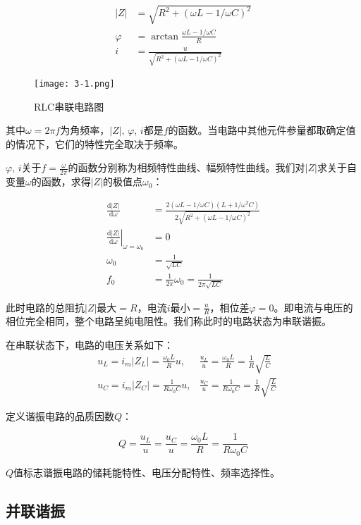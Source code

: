 \documentclass[12pt]{article}
\begin{document}
\[
    \begin{aligned}
        |Z|&=\sqrt{R^2+(\omega L-1/\omega C)^2} \\
        \varphi&=\arctan\frac{\omega L-1/\omega C}{R} \\
        i&=\frac{u}{\sqrt{R^2+(\omega L-1/\omega C)^2}}
    \end{aligned}
\]

\begin{figure}[htbp]\label{fig:1}
    \centering
    \texttt{[image: 3-1.png]}
    \caption{RLC串联电路图}
\end{figure}

其中$\omega=2\pi f$为角频率，$|Z|,\,\varphi,\,i$都是$f$的函数。当电路中其他元件参量都取确定值的情况下，它们的特性完全取决于频率。

$\varphi,\,i$关于$f=\frac{\omega}{2\pi}$的函数分别称为相频特性曲线、幅频特性曲线。我们对$|Z|$求关于自变量$\omega$的函数，求得$|Z|$的极值点$\omega_0$：

\[
    \begin{aligned}
        \frac{\mathrm{d}|Z|}{\mathrm{d}\omega}&=\frac{2(\omega L-1/\omega C)(L+1/\omega^2C)}{2\sqrt{R^2+(\omega L-1/\omega C)^2}} \\
        \left.\frac{\mathrm{d}|Z|}{\mathrm{d}\omega}\right|_{\omega = \omega_0}&=0 \\
        \omega_0&=\frac{1}{\sqrt{LC}} \\
        f_0&=\frac{1}{2\pi}\omega_0=\frac{1}{2\pi\sqrt{LC}}
    \end{aligned}
\]

此时电路的总阻抗$|Z|$最大$=R$，电流$i$最小$=\frac{u}{R}$，相位差$\varphi=0$。即电流与电压的相位完全相同，整个电路呈纯电阻性。我们称此时的电路状态为串联谐振。

在串联状态下，电路的电压关系如下：
\[
    \begin{aligned}
        &u_L=i_m|Z_L|=\frac{\omega_0L}{R}u,&\frac{u_L}{u}=\frac{\omega_0L}{R}=\frac{1}{R}\sqrt{\frac{L}{C}} \\
        &u_C=i_m|Z_C|=\frac{1}{R\omega_0C}u,&\frac{u_C}{u}=\frac{1}{R\omega_0C}=\frac{1}{R}\sqrt{\frac{L}{C}}
    \end{aligned}
\]

定义谐振电路的品质因数$Q$：

\[
    Q=\frac{u_L}{u}=\frac{u_C}{u}=\frac{\omega_0L}{R}=\frac{1}{R\omega_0C}
\]

$Q$值标志谐振电路的储耗能特性、电压分配特性、频率选择性。

\subsection{并联谐振}
\end{document}

